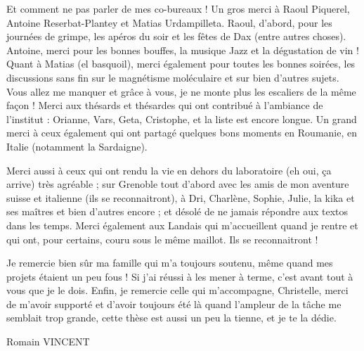Et comment ne pas parler de mes co-bureaux ! Un gros merci à Raoul Piquerel, Antoine Reserbat-Plantey et Matias Urdampilleta. Raoul, d'abord, pour les journées de grimpe, les apéros du soir et les fêtes de Dax (entre autres choses). Antoine, merci pour les bonnes bouffes, la musique Jazz et la dégustation de vin ! Quant à Matias (el basquoil), merci également pour toutes les bonnes soirées, les discussions sans fin sur le magnétisme moléculaire et sur bien d'autres sujets. Vous allez me manquer et grâce à vous, je ne monte plus les escaliers de la même façon !
Merci aux thésards et thésardes qui ont contribué à l'ambiance de l'institut : Orianne, Vars, Geta, Cristophe, et la liste est encore longue. Un grand merci à ceux également qui ont partagé quelques bons moments en Roumanie, en Italie (notamment la Sardaigne).


Merci aussi à ceux qui ont rendu la vie en dehors du laboratoire (eh oui, ça arrive) très agréable ; sur Grenoble tout d'abord avec les amis de mon aventure suisse et italienne (ils se reconnaitront), à Dri, Charlène, Sophie, Julie, la kika et ses maîtres et bien d'autres encore ; et désolé de ne jamais répondre aux textos dans les temps. Merci également aux Landais qui m'accueillent quand je rentre et qui ont, pour certains, couru sous le même maillot. Ils se reconnaitront !


Je remercie bien sûr ma famille qui m'a toujours soutenu, même quand mes projets étaient un peu fous ! Si j'ai réussi à les mener à terme, c'est avant tout à vous que je le dois. Enfin, je remercie celle qui m'accompagne, Christelle, merci de m'avoir supporté et d'avoir toujours été là quand l'ampleur de la tâche me semblait trop grande, cette thèse est aussi un peu la tienne, et je te la dédie.

\vspace{1cm}
\hspace{8cm} Romain VINCENT